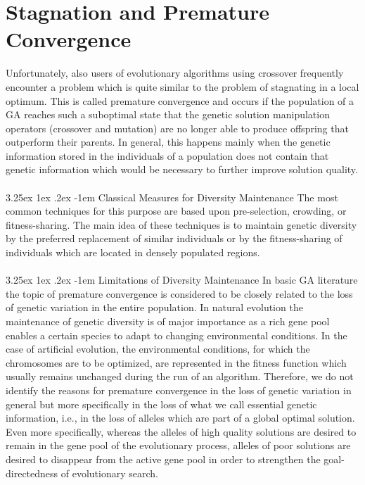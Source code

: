 \documentclass[12pt]{book}
\makeatletter
\renewcommand\paragraph{\@startsection{paragraph}{5}{\z@}%
  {3.25ex \@plus1ex \@minus.2ex}%
  {-1em}%
  {\normalfont\normalsize\bfseries}}
\makeatother
\begin{document}
\section{Stagnation and Premature Convergence}
Unfortunately, also users of evolutionary algorithms using crossover frequently encounter a problem which is quite similar to the problem of stagnating in a local optimum. This is called premature convergence and occurs if the population of a GA reaches such a suboptimal state that the genetic solution manipulation operators (crossover and mutation) are no longer able to produce offspring that outperform their parents. In general, this happens mainly when the genetic information stored in the individuals of a population does not contain that genetic information which would be necessary to further improve solution quality.\\\\
\paragraph{Classical Measures for Diversity Maintenance}
The most common techniques for this purpose are based upon pre-selection, crowding, or fitness-sharing. The main idea of these techniques is to maintain genetic diversity by the preferred replacement of similar individuals or by the fitness-sharing of individuals which are located in densely populated regions.\\\\
\paragraph{Limitations of Diversity Maintenance}
In basic GA literature the topic of premature convergence is considered to be closely related to the loss of genetic variation in the entire population. In natural evolution the maintenance of genetic diversity is of major importance as a rich gene pool enables a certain species to adapt to changing environmental conditions. In the case of artificial evolution, the environmental conditions, for which the chromosomes are to be optimized, are represented in the fitness function which usually remains unchanged during the run of an algorithm. Therefore, we do not identify the reasons for premature convergence in the loss of genetic variation in general but more specifically in the loss of what we call essential genetic information, i.e., in the loss of alleles which are part of a global optimal solution. Even more specifically, whereas the alleles of high quality solutions are desired to remain in the gene pool of the evolutionary process, alleles of poor solutions are desired to disappear from the active gene pool in order to strengthen the goal-directedness of evolutionary search.
\end{document}

